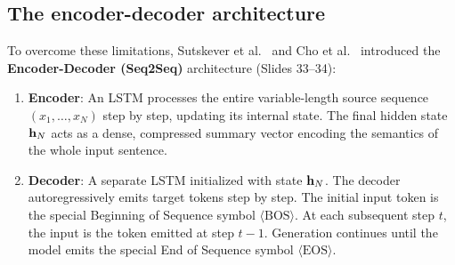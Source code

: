 \documentclass[../../main.tex]{subfiles}
\begin{document}
\subsection{The encoder-decoder architecture}
To overcome these limitations, Sutskever et al.~\cite{sutskever2014} and Cho et al.~\cite{cho2014} introduced the \textbf{Encoder-Decoder (Seq2Seq)} architecture (Slides 33--34):
\begin{enumerate}
    \item \textbf{Encoder}: An LSTM processes the entire variable-length source sequence $(x_1, \dots, x_N)$ step by step, updating its internal state. The final hidden state $\mathbf{h}_N$ acts as a dense, compressed summary vector encoding the semantics of the whole input sentence.
    \item \textbf{Decoder}: A separate LSTM initialized with state $\mathbf{h}_N$. The decoder autoregressively emits target tokens step by step. The initial input token is the special Beginning of Sequence symbol $\langle\text{BOS}\rangle$. At each subsequent step $t$, the input is the token emitted at step $t-1$. Generation continues until the model emits the special End of Sequence symbol $\langle\text{EOS}\rangle$.
\end{enumerate}
\end{document}
